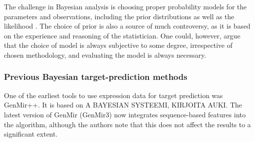 The challenge in Bayesian analysis is choosing proper probability models for
the parameters and observations, including the prior
distributions as well as the likelihood \citep{Gelman2013}.
The choice of prior is also a source of much controversy, as it is based
on the experience and reasoning of the statistician.
One could, however, argue that the choice of model is always subjective to some
degree, irrespective of chosen methodology, and evaluating the model is always necessary.





\subsubsection{Previous Bayesian target-prediction methods}


One of the earliest tools to use expression data for target prediction was
GenMir++. It is based on A BAYESIAN SYSTEEMI, KIRJOITA AUKI.
The latest version of GenMir (GenMir3) now integrates sequence-based features
into the algorithm, although the authors note that this does not affect the
results to a significant extent.

